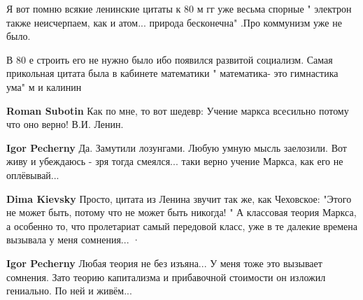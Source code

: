 \begin{itemize}

Я вот помню всякие ленинские цитаты к 80 м гг уже весьма спорные " электрон
также неисчерпаем, как и атом... природа бесконечна" .Про коммунизм уже не было.

В 80 е строить его не нужно было ибо появился развитой социализм. Самая
прикольная цитата была в кабинете математики " математика- это гимнастика ума"
м и калинин

\begin{itemize}


\textbf{Roman Subotin} Как по мне, то вот шедевр:
Учение маркса всесильно потому что оно верно!
В.И. Ленин.

\begin{itemize}
 
\textbf{Igor Pecherny} Да. Замутили лозунгами. Любую умную мысль заелозили. Вот
живу и убеждаюсь - зря тогда смеялся... таки верно учение Маркса, как его не
оплёвывай...


 

\textbf{Dima Kievsky} Просто, цитата из Ленина звучит так же, как Чеховское:
"Этого не может быть, потому что не может быть никогда! " А классовая теория
Маркса, а особенно то, что пролетариат самый передовой класс, уже в те далекие
времена вызывала у меня сомнения...  · 


 
\textbf{Igor Pecherny} Любая теория не без изъяна... У меня тоже это вызывает
сомнения. Зато теорию капитализма и прибавочной стоимости он изложил гениально.
По ней и живём...
\end{itemize}


\end{itemize}
\end{itemize}
